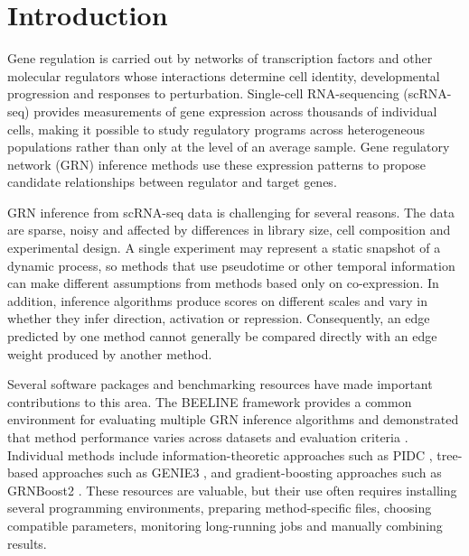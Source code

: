 \documentclass[unnumsec,webpdf,modern,large]{oup-authoring-template}%
\begin{document}
\maketitle

\section{Introduction}

Gene regulation is carried out by networks of transcription factors and other molecular regulators whose interactions determine cell identity, developmental progression and responses to perturbation. Single-cell RNA-sequencing (scRNA-seq) provides measurements of gene expression across thousands of individual cells, making it possible to study regulatory programs across heterogeneous populations rather than only at the level of an average sample. Gene regulatory network (GRN) inference methods use these expression patterns to propose candidate relationships between regulator and target genes.

GRN inference from scRNA-seq data is challenging for several reasons. The data are sparse, noisy and affected by differences in library size, cell composition and experimental design. A single experiment may represent a static snapshot of a dynamic process, so methods that use pseudotime or other temporal information can make different assumptions from methods based only on co-expression. In addition, inference algorithms produce scores on different scales and vary in whether they infer direction, activation or repression. Consequently, an edge predicted by one method cannot generally be compared directly with an edge weight produced by another method.

Several software packages and benchmarking resources have made important contributions to this area. The BEELINE framework provides a common environment for evaluating multiple GRN inference algorithms and demonstrated that method performance varies across datasets and evaluation criteria \citep{pratapa2020benchmarking}. Individual methods include information-theoretic approaches such as PIDC \citep{chan2017pidc}, tree-based approaches such as GENIE3 \citep{huynhthu2010genie3}, and gradient-boosting approaches such as GRNBoost2 \citep{moerman2019grnboost2}. These resources are valuable, but their use often requires installing several programming environments, preparing method-specific files, choosing compatible parameters, monitoring long-running jobs and manually combining results.
\end{document}
